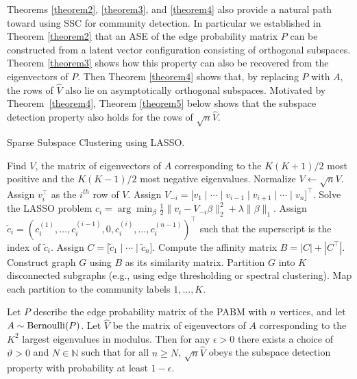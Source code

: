 \documentclass[12pt]{article}
\begin{document}
Theorems \ref{theorem2}, \ref{theorem3}, and \ref{theorem4} also provide
a natural path toward using SSC for community detection. 
In particular we established in Theorem \ref{theorem2} that an ASE of the edge
probability matrix \(P\) can be constructed from a latent vector configuration 
consisting of orthogonal subspaces. Theorem \ref{theorem3} shows how 
this property can also be recovered from the eigenvectors of \(P\). 
Then Theorem \ref{theorem4} shows that, by replacing $P$ with $A$, the
rows of $\hat{V}$ also lie on asymptotically orthogonal subspaces.
Motivated by Theorem~\ref{theorem4}, Theorem \ref{theorem5} below
shows that the subspace detection property also holds for the rows of
$\sqrt{n} \hat{V}$. 
\begin{algorithm}[t]
  \label{alg:ssc}
  \DontPrintSemicolon
  \SetAlgoLined
  \caption{Sparse Subspace Clustering using LASSO.}
    Find $V$, the matrix of eigenvectors of $A$
    corresponding to the $K (K + 1) / 2$ most positive
    and the $K (K - 1) / 2$ most negative eigenvalues.\;
    Normalize $V \leftarrow \sqrt{n} V$.\;
     {
      Assign $v_i^\top$ as the $i^{th}$ row of $V$.
      Assign $V_{-i} = \bigl[
      v_1 \mid \cdots \mid v_{i-1} \mid v_{i+1} \mid \cdots \mid v_n \bigr]^\top$.\;
      Solve the LASSO problem
      $c_i = \arg\min_{\beta}
      \frac{1}{2} \|v_i - V_{-i} \beta\|_2^2 + \lambda \|\beta\|_1$.\;
      Assign $\tilde{c}_i = (c_i^{(1)}, \dots, c_i^{(i-1)}, 0, c_i^{(i)}, \dots, c_i^{(n-1)})^\top$ such that the superscript is the index of
      $\tilde{c}_i$.\;
    }
    Assign
    $C = \bigr[ \tilde{c}_1 \mid \cdots \mid \tilde{c}_n \bigr]$.\;
    Compute the affinity matrix $B = |C| + |C^\top|$.\;
    Construct graph $G$ using $B$ as its similarity matrix.\;
    Partition $G$ into $K$ disconnected subgraphs (e.g., using edge
    thresholding or spectral clustering).\;
    Map each partition to the community labels $1, ..., K$.
\end{algorithm}

\begin{theorem}
\label{theorem5}
Let $P$ describe the edge probability matrix of the PABM with
$n$ vertices, and let $A \sim \mathrm{Bernoulli}(P)$.  Let $\hat{V}$ be the
matrix of eigenvectors of $A$ corresponding to the $K^2$ largest
eigenvalues in modulus. Then for any $\epsilon > 0$ 
there exists a choice of $\vartheta > 0$ and $N \in \mathbb{N}$ such
that for all $n \geq N$, $\sqrt{n} \hat{V}$ obeys the subspace detection property with
probability at least $1 - \epsilon$.  
\end{theorem}
\end{document}
